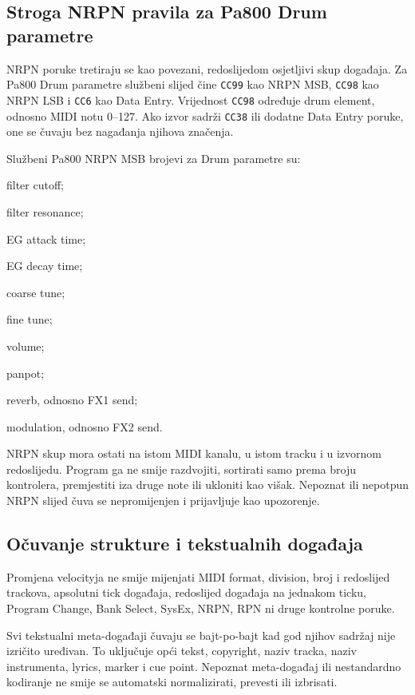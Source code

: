 \documentclass[11pt]{article}
\begin{document}
\subsection{Stroga NRPN pravila za Pa800 Drum parametre}

NRPN poruke tretiraju se kao povezani, redoslijedom osjetljivi skup događaja.
Za Pa800 Drum parametre službeni slijed čine \texttt{CC99} kao NRPN MSB,
\texttt{CC98} kao NRPN LSB i \texttt{CC6} kao Data Entry. Vrijednost
\texttt{CC98} određuje drum element, odnosno MIDI notu 0--127. Ako izvor
sadrži \texttt{CC38} ili dodatne Data Entry poruke, one se čuvaju bez
nagađanja njihova značenja.

Službeni Pa800 NRPN MSB brojevi za Drum parametre su:

\begin{description}[style=nextline]
    \item[20] filter cutoff;
    \item[21] filter resonance;
    \item[22] EG attack time;
    \item[23] EG decay time;
    \item[24] coarse tune;
    \item[25] fine tune;
    \item[26] volume;
    \item[28] panpot;
    \item[29] reverb, odnosno FX1 send;
    \item[30] modulation, odnosno FX2 send.
\end{description}

NRPN skup mora ostati na istom MIDI kanalu, u istom tracku i u izvornom
redoslijedu. Program ga ne smije razdvojiti, sortirati samo prema broju
kontrolera, premjestiti iza druge note ili ukloniti kao višak. Nepoznat ili
nepotpun NRPN slijed čuva se nepromijenjen i prijavljuje kao upozorenje.

\subsection{Očuvanje strukture i tekstualnih događaja}

Promjena velocityja ne smije mijenjati MIDI format, division, broj i redoslijed
trackova, apsolutni tick događaja, redoslijed događaja na jednakom ticku,
Program Change, Bank Select, SysEx, NRPN, RPN ni druge kontrolne poruke.

Svi tekstualni meta-događaji čuvaju se bajt-po-bajt kad god njihov sadržaj nije
izričito uređivan. To uključuje opći tekst, copyright, naziv tracka, naziv
instrumenta, lyrics, marker i cue point. Nepoznat meta-događaj ili nestandardno
kodiranje ne smije se automatski normalizirati, prevesti ili izbrisati.
\end{document}
